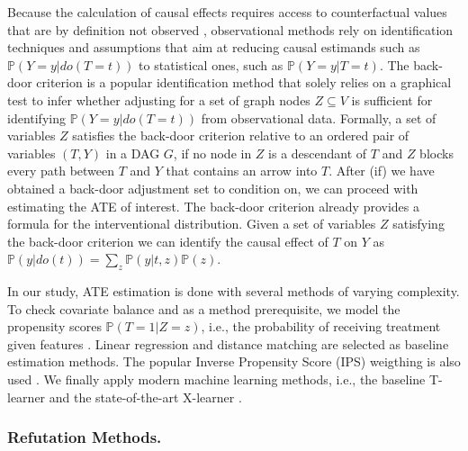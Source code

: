 \documentclass[letterpaper]{article} %
\begin{document}
Because the calculation of causal effects requires access to counterfactual values that are by definition not observed \cite{holland1986statistics}, observational methods rely on identification techniques and assumptions that aim at reducing causal estimands such as $\mathbb{P}(Y=y|do(T=t))$ to statistical ones, such as $\mathbb{P}(Y=y|T=t)$. The back-door criterion is a popular identification method that solely relies on a graphical test to infer whether adjusting for a set of graph nodes $Z\subseteq V$ is sufficient for identifying $\mathbb{P}(Y=y|do(T=t))$ from observational data. Formally, a set of variables $Z$ satisfies the back-door criterion relative to an ordered pair of variables $(T, Y)$ in a DAG $G$, if no node in $Z$ is a descendant of $T$ and $Z$ blocks every path between $T$ and $Y$ that contains an arrow into $T$.
After (if) we have obtained a back-door adjustment set to condition on, we can proceed with estimating the ATE of interest. The back-door criterion already provides a formula for the interventional distribution. Given a set of variables $Z$ satisfying the back-door criterion we can identify the causal effect of $T$ on $Y$ as $\mathbb{P}(y|do(t)) = \sum_z \mathbb{P}(y|t, z)\mathbb{P}(z)$.

In our study, ATE estimation is done with several methods of varying complexity. To check covariate balance and as a method prerequisite, we model the propensity scores $\mathbb{P}(T=1|Z=z)$, i.e., the probability of receiving treatment given features \cite{rosenbaum1983central}. Linear regression and distance matching are selected as baseline estimation methods. The popular Inverse Propensity Score (IPS) weigthing is also used \cite{stuart2010matching}. We finally apply modern machine learning methods, i.e., the baseline T-learner and the state-of-the-art X-learner \cite{kunzel_metalearners_2019}.

\subsubsection{Refutation Methods.}
\end{document}
